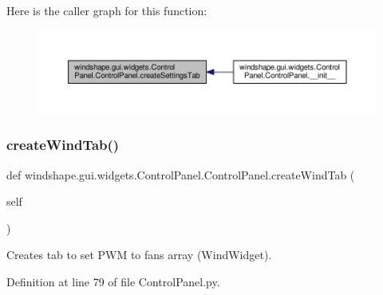 Here is the caller graph for this function\+:\nopagebreak
\begin{figure}[H]
\begin{center}
\leavevmode
\includegraphics[width=350pt]{classwindshape_1_1gui_1_1widgets_1_1_control_panel_1_1_control_panel_afac9dab02e9d0ffaa5f6e6df0c2cd9dd_icgraph}
\end{center}
\end{figure}
\mbox{\label{classwindshape_1_1gui_1_1widgets_1_1_control_panel_1_1_control_panel_a354b1be4355bbb095dca97edfdc64b0a}} 
\subsubsection{\texorpdfstring{create\+Wind\+Tab()}{createWindTab()}}
{\footnotesize\ttfamily def windshape.\+gui.\+widgets.\+Control\+Panel.\+Control\+Panel.\+create\+Wind\+Tab (\begin{DoxyParamCaption}\item[{}]{self }\end{DoxyParamCaption})}

\begin{DoxyVerb}Creates tab to set PWM to fans array (WindWidget).\end{DoxyVerb}
 

Definition at line 79 of file Control\+Panel.\+py.

